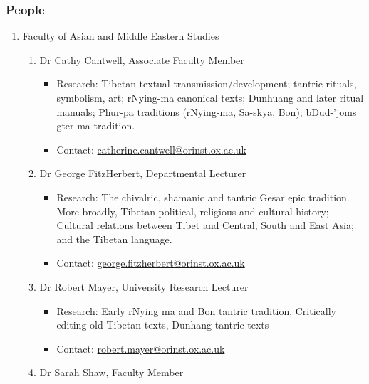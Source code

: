 \documentclass[a4paper,10.5pt]{article}
\begin{document}
\subsubsection{People}
\label{sec:orgefc41c8}
\begin{enumerate}
\item \href{https://orinst.web.ox.ac.uk/}{Faculty of Asian and Middle Eastern Studies}
\label{sec:org70dfe16}
\begin{enumerate}
\item Dr Cathy Cantwell, Associate Faculty Member
\label{sec:org0270922}
\begin{itemize}
\item Research: Tibetan textual transmission/development; tantric rituals, symbolism, art; rNying-ma canonical texts; Dunhuang and later ritual manuals; Phur-pa traditions (rNying-ma, Sa-skya, Bon); bDud-’joms gter-ma tradition.\\
\item Contact: \href{mailto:catherine.cantwell@orinst.ox.ac.uk}{catherine.cantwell@orinst.ox.ac.uk}\\
\end{itemize}
\item Dr George FitzHerbert, Departmental Lecturer
\label{sec:orgf31a43d}
\begin{itemize}
\item Research: The chivalric, shamanic and tantric Gesar epic tradition.  More broadly, Tibetan political, religious and cultural history; Cultural relations between Tibet and Central, South and East Asia; and the Tibetan language.\\
\item Contact: \href{mailto:george.fitzherbert@orinst.ox.ac.uk}{george.fitzherbert@orinst.ox.ac.uk}\\
\end{itemize}
\item Dr Robert Mayer, University Research Lecturer
\label{sec:org12e389a}
\begin{itemize}
\item Research: Early rNying ma and Bon tantric tradition, Critically editing old Tibetan texts, Dunhang tantric texts\\
\item Contact: \href{mailto:robert.mayer@orinst.ox.ac.uk}{robert.mayer@orinst.ox.ac.uk}\\
\end{itemize}
\item Dr Sarah Shaw, Faculty Member
\label{sec:org83a90a5}

\end{enumerate}
\end{enumerate}
\end{document}
